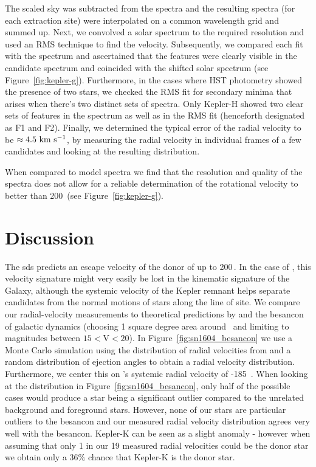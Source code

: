 \documentclass[preprint2]{aastex}
\begin{document}
The scaled sky was subtracted from the spectra and the resulting spectra (for each extraction site) were interpolated on a common wavelength grid and summed up. Next, we convolved a solar spectrum to the required resolution and used an RMS technique to find the velocity. Subsequently, we compared each fit with the spectrum and ascertained that the  features were clearly visible in the candidate spectrum and coincided with the shifted solar spectrum (see Figure~\ref{fig:kepler-g}). Furthermore, in the cases where HST photometry showed the presence of two stars, we checked the RMS fit for secondary minima that arises when there's two distinct sets of spectra. Only Kepler-H showed two clear sets of  features in the spectrum as well as in the RMS fit (henceforth designated as F1 and F2). Finally, we determined the typical error of the radial velocity to be $\approx4.5~\textrm{km}~\textrm{s}^{-1}$, by measuring the radial velocity in individual frames of a few candidates and looking at the resulting distribution. 

When compared to model spectra we find that the resolution and quality of the spectra does not allow for a reliable determination of the rotational velocity to better than 200~\kms (see Figure~\ref{fig:kepler-g}). 





\section{Discussion}
\label{sec:discussion}

The \gls{sds} predicts an escape velocity of the donor of up to 200\,\kms \citep[see ][]{2008ApJ...677L.109H}. In the case of , this velocity signature might very easily be lost in the kinematic signature of the Galaxy, although the systemic velocity of the Kepler remnant helps separate candidates from the normal motions of stars along the line of site. We compare our radial-velocity measurements to theoretical predictions by \citet{2008ApJ...677L.109H} and the \gls{besancon} of galactic dynamics (choosing 1 square degree area around \ and limiting to magnitudes between $15<$V$<20$). In Figure~\ref{fig:sn1604_besancon} we use a Monte Carlo simulation using the distribution of radial velocities from \citet{2008ApJ...677L.109H} and a random distribution of ejection angles to obtain a radial velocity distribution. Furthermore, we center this on 's systemic radial velocity of -185~\kms \citep{2003A&A...407..249S}. When looking at the \citet{2008ApJ...677L.109H} distribution in Figure~\ref{fig:sn1604_besancon}, only half of the possible cases would produce a star being a significant outlier compared to the unrelated background and foreground stars. However, none of our stars are particular outliers to the \gls{besancon} and our measured radial velocity distribution agrees very well with the \gls{besancon}. Kepler-K can be seen as a slight anomaly - however when assuming that only 1 in our 19 measured radial velocities could be the donor star we obtain only a $36\%$ chance that Kepler-K is the donor star.
\end{document}
